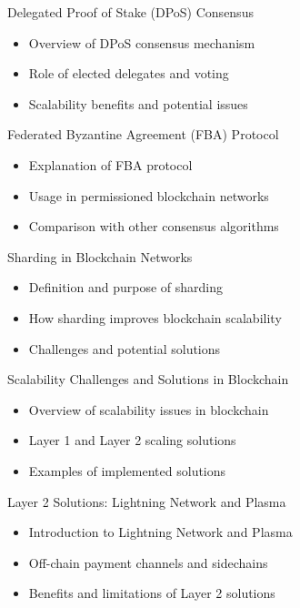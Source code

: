 \begin{withoutheadline}
\begin{frame}{Delegated Proof of Stake (DPoS) Consensus}
    \begin{itemize}
        \item Overview of DPoS consensus mechanism
        \item Role of elected delegates and voting
        \item Scalability benefits and potential issues
    \end{itemize}
\end{frame}

\begin{frame}{Federated Byzantine Agreement (FBA) Protocol}
    \begin{itemize}
        \item Explanation of FBA protocol
        \item Usage in permissioned blockchain networks
        \item Comparison with other consensus algorithms
    \end{itemize}
\end{frame}

\begin{frame}{Sharding in Blockchain Networks}
    \begin{itemize}
        \item Definition and purpose of sharding
        \item How sharding improves blockchain scalability
        \item Challenges and potential solutions
    \end{itemize}
\end{frame}

\begin{frame}{Scalability Challenges and Solutions in Blockchain}
    \begin{itemize}
        \item Overview of scalability issues in blockchain
        \item Layer 1 and Layer 2 scaling solutions
        \item Examples of implemented solutions
    \end{itemize}
\end{frame}

\begin{frame}{Layer 2 Solutions: Lightning Network and Plasma}
    \begin{itemize}
        \item Introduction to Lightning Network and Plasma
        \item Off-chain payment channels and sidechains
        \item Benefits and limitations of Layer 2 solutions
    \end{itemize}
\end{frame}


\end{withoutheadline}
